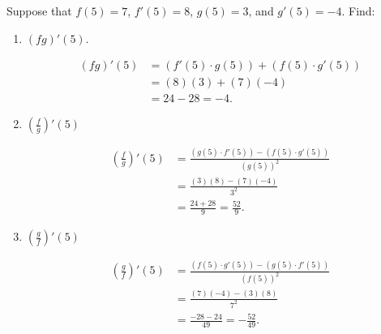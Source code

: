 \documentclass[handout,nooutcomes]{ximera}
\begin{document}
\begin{problem}
Suppose that $f(5) = 7$, $f'(5) = 8$, $g(5) = 3$, and $g'(5) = -4$.  Find:

	\begin{enumerate}
	
	\item  $(fg)'(5)$.
		\begin{freeResponse}
		\begin{align*}
		(fg)'(5) &= (f'(5) \cdot g(5)) + (f(5) \cdot g'(5))  \\
		&= (8)(3) + (7)(-4)  \\
		&= 24 - 28 = -4.
		\end{align*}
		\end{freeResponse}
		
		
		
	\item $ \left( \frac{f}{g} \right)' (5)$
		\begin{freeResponse}
		\begin{align*}
		\left( \frac{f}{g} \right)' (5) &= \frac{(g(5) \cdot f'(5)) - (f(5) \cdot g'(5))}{(g(5))^2}  \\
		&= \frac{(3)(8) - (7)(-4)}{3^2}  \\
		&= \frac{24 + 28}{9} = \frac{52}{9}.
		\end{align*}
		\end{freeResponse}
		
		
		
	\item $ \left( \frac{g}{f} \right)' (5)$
		\begin{freeResponse}
		\begin{align*}
		\left( \frac{g}{f} \right)' (5) &= \frac{(f(5) \cdot g'(5)) - (g(5) \cdot f'(5))}{(f(5))^2}  \\
		&= \frac{(7)(-4) - (3)(8)}{7^2}  \\
		&= \frac{-28 - 24}{49} = - \frac{52}{49}.
		\end{align*}
		\end{freeResponse}
		
	
	
	\end{enumerate}
		
\end{problem}
\end{document}
